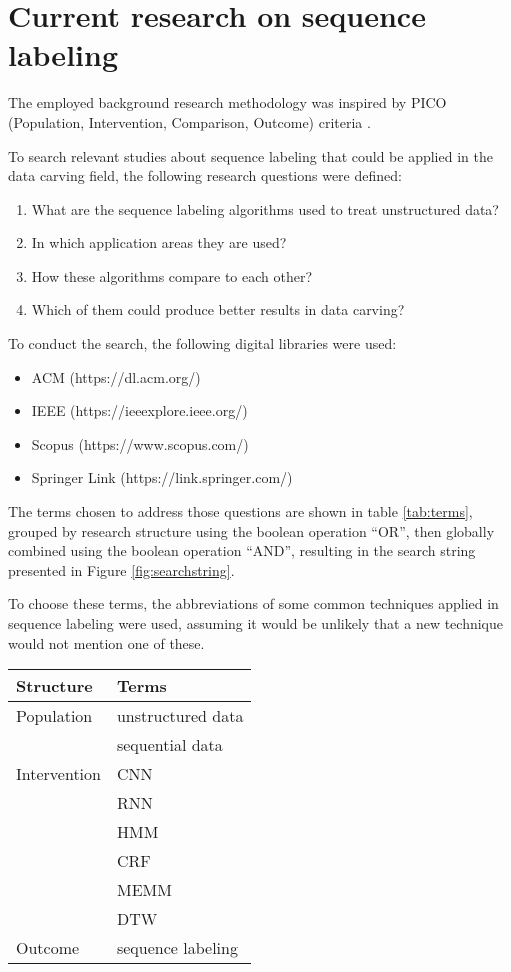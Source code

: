 \section{Current research on sequence labeling}
The employed background research methodology was inspired by PICO (Population, Intervention, Comparison, Outcome) criteria \cite{Kitchenham07guidelinesfor}.

To search relevant studies about sequence labeling that could be applied in the data carving field, the following research questions were defined:

\begin{enumerate}
\item   What are the sequence labeling algorithms used to treat unstructured data?
\item   In which application areas they are used?
\item   How these algorithms compare to each other?
\item   Which of them could produce better results in data carving?
\end{enumerate}

To conduct the search, the following digital libraries were used: 
\begin{itemize}
\item{ACM} (https://dl.acm.org/)
\item IEEE (https://ieeexplore.ieee.org/)
\item Scopus (https://www.scopus.com/) 
\item Springer Link (https://link.springer.com/)
\end{itemize}

The terms chosen to address those questions are shown in table \ref{tab:terms}, grouped by research structure using the boolean operation “OR”, then globally combined using the boolean operation “AND”, resulting in the search string presented in  Figure \ref{fig:searchstring}.

To choose these terms, the abbreviations of some common techniques applied in sequence labeling were used, assuming it would be unlikely that a new technique would not mention one of these.

\begin{table*}[!ht]
    \centering
    \begin{tabular}{ l  l  }
      Structure 	& Terms 		 \\
      \hline\hline
      Population 	& unstructured data \\   
                    & sequential data \\
      \hline
      Intervention 	& CNN \\
                    & RNN \\
                    & HMM \\
                    & CRF \\
                    & MEMM \\
                    & DTW \\
      \hline
      Outcome 		& sequence labeling \\
      \hline
    \end{tabular}
    \caption{Terms used}
    \label{tab:terms}
\end{table*}

